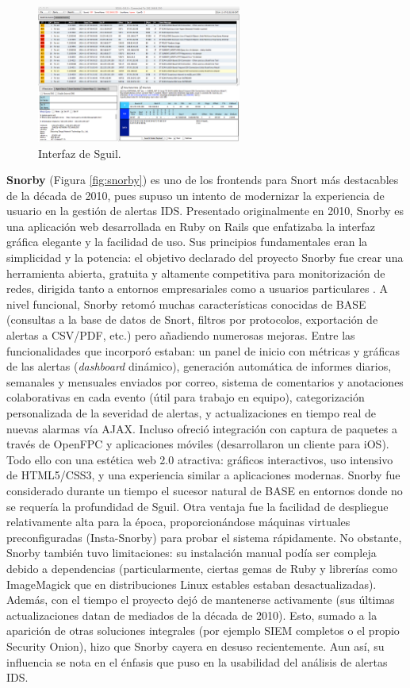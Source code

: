 \documentclass[11pt,a4paper,twoside]{report}
\begin{document}
\begin{figure}[H]
	\centering
	\includegraphics[width=0.6\textwidth]{documento/21.png}
	\caption{Interfaz de Sguil.}
	\label{fig:sguil}
\end{figure}

\textbf{Snorby} (Figura \ref{fig:snorby}) es uno de los frontends para Snort más destacables de la década de 2010, pues supuso un intento de modernizar la experiencia de usuario en la gestión de alertas IDS. Presentado originalmente en 2010, Snorby es una aplicación web desarrollada en Ruby on Rails que enfatizaba la interfaz gráfica elegante y la facilidad de uso. Sus principios fundamentales eran la simplicidad y la potencia: el objetivo declarado del proyecto Snorby fue crear una herramienta abierta, gratuita y altamente competitiva para monitorización de redes, dirigida tanto a entornos empresariales como a usuarios particulares \cite{SnorbyHelpnet2010}. A nivel funcional, Snorby retomó muchas características conocidas de BASE (consultas a la base de datos de Snort, filtros por protocolos, exportación de alertas a CSV/PDF, etc.) pero añadiendo numerosas mejoras. Entre las funcionalidades que incorporó estaban: un panel de inicio con métricas y gráficas de las alertas (\textit{dashboard} dinámico), generación automática de informes diarios, semanales y mensuales enviados por correo, sistema de comentarios y anotaciones colaborativas en cada evento (útil para trabajo en equipo), categorización personalizada de la severidad de alertas, y actualizaciones en tiempo real de nuevas alarmas vía AJAX. Incluso ofreció integración con captura de paquetes a través de OpenFPC y aplicaciones móviles (desarrollaron un cliente para iOS). Todo ello con una estética web 2.0 atractiva: gráficos interactivos, uso intensivo de HTML5/CSS3, y una experiencia similar a aplicaciones modernas. Snorby fue considerado durante un tiempo el sucesor natural de BASE en entornos donde no se requería la profundidad de Sguil. Otra ventaja fue la facilidad de despliegue relativamente alta para la época, proporcionándose máquinas virtuales preconfiguradas (Insta-Snorby) para probar el sistema rápidamente. No obstante, Snorby también tuvo limitaciones: su instalación manual podía ser compleja debido a dependencias (particularmente, ciertas gemas de Ruby y librerías como ImageMagick que en distribuciones Linux estables estaban desactualizadas). Además, con el tiempo el proyecto dejó de mantenerse activamente (sus últimas actualizaciones datan de mediados de la década de 2010). Esto, sumado a la aparición de otras soluciones integrales (por ejemplo SIEM completos o el propio Security Onion), hizo que Snorby cayera en desuso recientemente. Aun así, su influencia se nota en el énfasis que puso en la usabilidad del análisis de alertas IDS.
\end{document}
